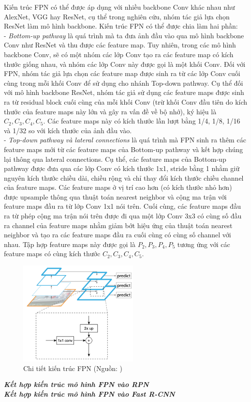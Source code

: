 {    \noindent
    Kiến trúc FPN có thể được áp dụng với nhiều backbone Conv khác nhau như AlexNet, VGG hay ResNet, cụ thể trong nghiên cứu, nhóm tác giả lựa chọn ResNet làm mô hình backbone.
    Kiến trúc FPN có thể được chia làm hai phần: \\
    - \textit{Bottom-up pathway} là quá trình mà ta đưa ảnh đầu vào qua mô hình backbone Conv như ResNet và thu được các feature map.
    Tuy nhiên, trong các mô hình backbone Conv, sẽ có một nhóm các lớp Conv tạo ra các feature map có kích thước giống nhau, và nhóm các lớp Conv này được gọi là một khối Conv.
    Đối với FPN, nhóm tác giả lựa chọn các feature map được sinh ra từ các lớp Conv cuối cùng trong mỗi khối Conv để sử dụng cho nhánh Top-down pathway.
    Cụ thể đối với mô hình backbone ResNet, nhóm tác giả sử dụng các feature maps được sinh ra từ residual block cuối cùng của mỗi khối Conv (trừ khối Conv đầu tiên do kích thước của feature maps này lớn và gây ra vấn đề về bộ nhớ), ký hiệu là \textit{{${C}_{2}, {C}_{3}, {C}_{4}, {C}_{5}$}}.
    Các feature maps này có kích thước lần lượt bằng 1/4, 1/8, 1/16 và 1/32 so với kích thước của ảnh đầu vào. \\
    - \textit{Top-down pathway và lateral connections} là quá trình mà FPN sinh ra thêm các feature maps mới từ các feature maps của Bottom-up pathway và kết hợp chúng lại thông qua lateral connections.
    Cụ thể, các feature maps của Bottom-up pathway được đưa qua các lớp Conv có kích thước 1x1, stride bằng 1 nhằm giữ nguyên kích thước chiều dài, chiều rộng và chỉ thay đổi kích thước chiều channel của feature maps.
    Các feature maps ở vị trí cao hơn (có kích thước nhỏ hơn) được upsample thông qua thuật toán nearest neighbor và cộng ma trận với feature maps đầu ra từ lớp Conv 1x1 nói trên.
    Cuối cùng, các feature maps đầu ra từ phép cộng ma trận nói trên được đi qua một lớp Conv 3x3 có cùng số đầu ra channel của feature maps nhằm giảm bớt hiệu ứng của thuật toán nearest neighbor và tạo ra các feature maps đầu ra cuối cùng có cùng số channel với nhau.
    Tập hợp feature maps này được gọi là \textit{{${P}_{2}, {P}_{3}, {P}_{4}, {P}_{5}$}} tương ứng với các feature maps có cùng kích thước \textit{{${C}_{2}, {C}_{3}, {C}_{4}, {C}_{5}$}}.

    \begin{figure}[H]
        \centering
        \includegraphics[width=6cm] {images/fpn_detail}
        \caption{Chi tiết kiến trúc FPN (Nguồn: \cite{lin2017feature})}
        \label{fig:fpn_detail}
    \end{figure}

    \noindent
    \textbf{\textit{Kết hợp kiến trúc mô hình FPN vào RPN}} \\

    \noindent
    \textbf{\textit{Kết hợp kiến trúc mô hình FPN vào Fast R-CNN}} \\
}